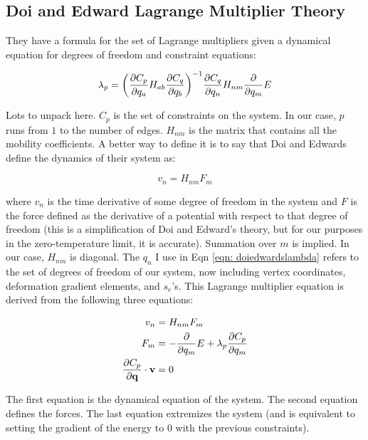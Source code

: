 \documentclass[12pt]{article}
\begin{document}
\subsection{Doi and Edward Lagrange Multiplier Theory}
They have a formula for the set of Lagrange multipliers given a dynamical equation for degrees of freedom and constraint equations:
\begin{center}
\begin{equation}
\label{eqn: doiedwardslambda}
\lambda_p = \bigg(\pdv{C_p}{q_a} H_{ab} \pdv{C_q}{q_b}\bigg)^{-1} \pdv{C_q}{q_n} H_{nm} \pdv{q_m} E
\end{equation}
\end{center}
Lots to unpack here. $C_p$ is the set of constraints on the system. In our case, $p$ runs from $1$ to the number of edges. $H_{nm}$ is the matrix that contains all the mobility coefficients. A better way to define it is to say that Doi and Edwards define the dynamics of their system as:
\begin{center}
\begin{equation}
\label{eqn: doiedwardsdyna}
v_n = H_{nm} F_m
\end{equation}
\end{center}
where $v_n$ is the time derivative of some degree of freedom in the system and $F$ is the force defined as the derivative of a potential with respect to that degree of freedom (this is a simplification of Doi and Edward's theory, but for our purposes in the zero-temperature limit, it is accurate). Summation over $m$ is implied. In our case, $H_{nm}$ is diagonal. The $q_n$ I use in Eqn \ref{eqn: doiedwardslambda} refers to the set of degrees of freedom of our system, now including vertex coordinates, deformation gradient elements, and $s_e$'s. This Lagrange multiplier equation is derived from the following three equations:
\begin{center}
\begin{equation}
\begin{split}
v_n &= H_{nm} F_m\\
F_m &= -\pdv{q_m} E + \lambda_p \pdv{C_p}{q_m} \\
\pdv{C_p}{\vb{q}}\cdot \vb{v} &= 0
\end{split}
\end{equation}
\end{center}
The first equation is the dynamical equation of the system. The second equation defines the forces. The last equation extremizes the system (and is equivalent to setting the gradient of the energy to $0$ with the previous constraints). \\ \\
\end{document}

